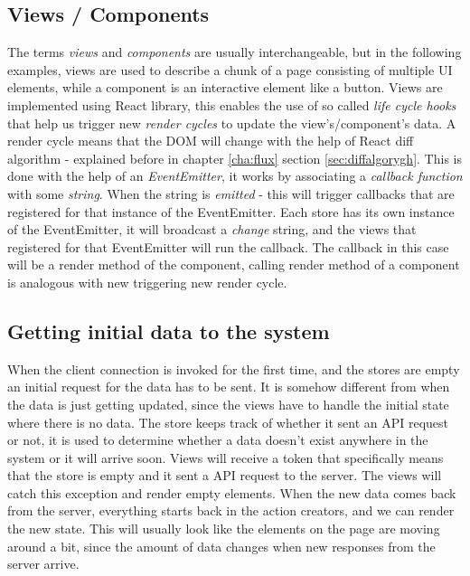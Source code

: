 \subsection*{Views / Components}
The terms \emph{views} and \emph{components} are usually interchangeable, but in the following examples, views are used to describe a chunk of a page consisting of multiple UI elements, while a component is an interactive element like a button. Views are implemented using React library, this enables the use of so called \emph{life cycle hooks} that help us trigger new \emph{render cycles} to update the view's/component's data. A render cycle means that the DOM will change with the help of React diff algorithm - explained before in chapter \ref{cha:flux} section \ref{sec:diffalgorygh}. This is done with the help of an \emph{EventEmitter}, it works by associating a \emph{callback function} with some \emph{string}. When the string is \emph{emitted} - this will trigger callbacks that are registered for that instance of the EventEmitter. Each store has its own instance of the EventEmitter, it will broadcast a \emph{change} string, and the views that registered for that EventEmitter will run the callback. The callback in this case will be a render method of the component, calling render method of a component is analogous with new triggering new render cycle.

\subsection*{Getting initial data to the system}
When the client connection is invoked for the first time, and the stores are empty an initial request for the data has to be sent. It is somehow different from when the data is just getting updated, since the views have to handle the initial state where there is no data. The store keeps track of whether it sent an API request or not, it is used to determine whether a data doesn't exist anywhere in the system or it will arrive soon. Views will receive a token that specifically means that the store is empty and it sent a API request to the server. The views will catch this exception and render empty elements. When the new data comes back from the server, everything starts back in the action creators, and we can render the new state. This will usually look like the elements on the page are moving around a bit, since the amount of data changes when new responses from the server arrive.

